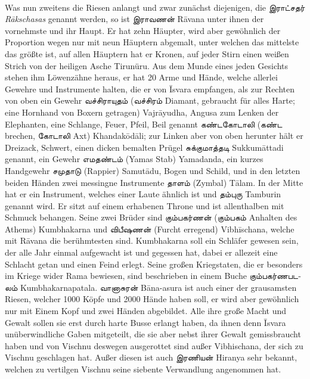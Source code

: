 \documentclass{article}
\newcommand{\TamilText}[1]{\texttamil{#1}}
\newcommand{\tam}[1]{\TamilText{#1}}
\begin{document}
\paragraph{}
Was nun zweitens die Riesen anlangt und zwar zunächst diejenigen, die \tam{இராட்சதர்} \emph{R\={a}kschasas} genannt werden, so ist \tam{இராவணன்} R\={a}vana unter ihnen der vornehmste und ihr Haupt. Er hat zehn Häupter, wird aber gewöhnlich der Proportion wegen nur mit neun Häuptern abgemalt, unter welchen das mittelste das größte ist, auf allen Häuptern hat er Kronen, auf jeder Stirn einen weißen Strich von der heiligen Asche Tirunüru. Aus dem Munde eines jeden Gesichts stehen ihm Löwenzähne heraus, er hat 20 Arme und Hände, welche allerlei Gewehre und Instrumente halten, die er von \={I}svara empfangen, als zur Rechten von oben ein Gewehr \tam{வச்சிராயுதம்} (\tam{வச்சிரம்} Diamant, gebraucht für alles Harte; eine Hornhand von Boxern getragen) Vajr\={a}yudha, Angusa zum Lenken der Elephanten, eine Schlange, Feuer, Pfeil, Beil genannt \tam{கண்டகோடாலி} (\tam{கண்ட} brechen, \tam{கோடாலி} Axt) Khandak\={o}d\={a}li; zur Linken aber von oben herunter hält er Dreizack, Schwert, einen dicken bemalten Prügel \tam{சுக்குமாத்தடி} Sukkum\={a}ttadi genannt, ein Gewehr \tam{எமதண்டம்} (Yamas Stab) Yamadanda, ein kurzes Handgewehr \tam{சமுதாடு} (Rappier) Samut\={a}du, Bogen und Schild, und in den letzten beiden Händen zwei messingne Instrumente \tam{தாளம்} (Zymbal) T\={a}lam. In der Mitte hat er ein Instrument, welches einer Laute ähnlich ist und \tam{தம்புரு} Tamburin genannt wird. Er sitzt auf einem erhabenen Throne und ist allenthalben mit Schmuck behangen. Seine zwei Brüder sind \tam{கும்பகர்ணன்} (\tam{கும்பகம்} Anhalten des Athems) Kumbhakarna und \tam{விபீஷணன்} (Furcht erregend) Vibh\={i}schana, welche mit R\={a}vana die berühmtesten sind. Kumbhakarna soll ein Schläfer gewesen sein, der alle Jahr einmal aufgewacht ist und gegessen hat, dabei er allezeit eine Schlacht getan und einen Feind erlegt. Seine großen Kriegstaten, die er besonders im Kriege wider Rama bewiesen, sind beschrieben in einem Buche \tam{கும்பகர்ணபடலம்} Kumbhakarnapatala. \tam{வானாசுரன்} B\={a}na-asura ist auch einer der grausamsten Riesen, welcher 1000 Köpfe und 2000 Hände haben soll, er wird aber gewöhnlich nur mit Einem Kopf und zwei Händen abgebildet. Alle ihre große Macht und Gewalt sollen sie erst durch harte Busse erlangt haben, da ihnen denn \={I}svara unüberwindliche Gaben mitgeteilt, die sie aber nebst ihrer Gewalt gemissbraucht haben und von Vischnu deswegen ausgerottet sind außer Vibhischana, der sich zu Vischnu geschlagen hat. Außer diesen ist auch \tam{இரணியன்} Hiranya sehr bekannt, welchen zu vertilgen Vischnu seine siebente Verwandlung angenommen hat.
\end{document}
